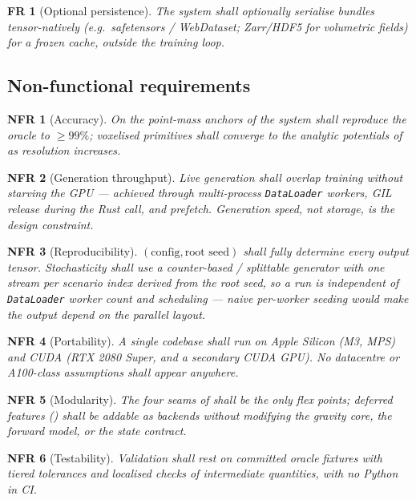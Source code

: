 \documentclass[11pt,a4paper]{article}
\theoremstyle{reqstyle}
\newtheorem{freq}{FR}
\newtheorem{nfreq}{NFR}
\begin{document}
\begin{freq}[Optional persistence]
The system shall optionally serialise bundles tensor-natively (e.g.\ safetensors /
WebDataset; Zarr/HDF5 for volumetric fields) for a frozen cache, outside the training loop.
\end{freq}

\subsection{Non-functional requirements}

\begin{nfreq}[Accuracy]
On the point-mass anchors of  the system shall reproduce the oracle to
$\geq 99\%$; voxelised primitives shall converge to the analytic potentials of
 as resolution increases.
\end{nfreq}

\begin{nfreq}[Generation throughput]
Live generation shall overlap training without starving the GPU --- achieved through
multi-process \texttt{DataLoader} workers, GIL release during the Rust call, and prefetch.
Generation speed, not storage, is the design constraint.
\end{nfreq}

\begin{nfreq}[Reproducibility]
$(\text{config},\text{root seed})$ shall fully determine every output tensor. Stochasticity
shall use a counter-based / splittable generator with one stream per scenario index derived
from the root seed, so a run is independent of \texttt{DataLoader} worker count and
scheduling --- naive per-worker seeding would make the output depend on the parallel layout.
\end{nfreq}

\begin{nfreq}[Portability]
A single codebase shall run on Apple Silicon (M3, MPS) and CUDA (RTX 2080 Super, and a
secondary CUDA GPU). No datacentre or A100-class assumptions shall appear anywhere.
\end{nfreq}

\begin{nfreq}[Modularity]
The four seams of  shall be the only flex points; deferred features
() shall be addable as backends without modifying the gravity core, the
forward model, or the state contract.
\end{nfreq}

\begin{nfreq}[Testability]
Validation shall rest on committed oracle fixtures with tiered tolerances and localised
checks of intermediate quantities, with no Python in CI.
\end{nfreq}
\end{document}

